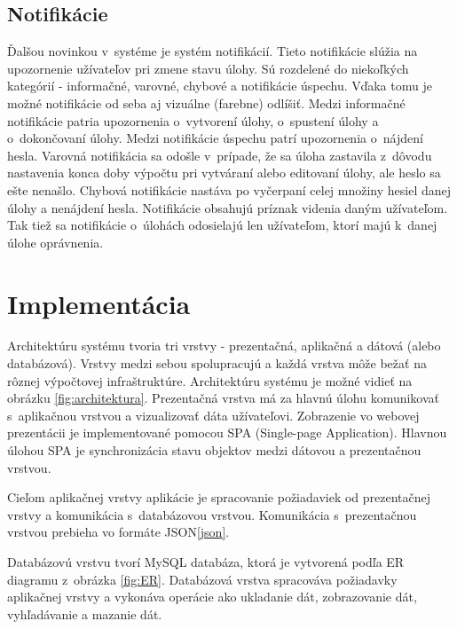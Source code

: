 \documentclass[slovak]{fitthesis}
\begin{document}
\section{Notifikácie}
Ďalšou novinkou v~systéme je systém notifikácií. Tieto notifikácie slúžia na upozornenie užívateľov pri zmene stavu úlohy. Sú rozdelené do niekoľkých kategórií - informačné, varovné, chybové a notifikácie úspechu. Vďaka tomu je možné notifikácie od seba aj vizuálne (farebne) odlíšiť. Medzi informačné notifikácie patria upozornenia o~vytvorení úlohy, o~spustení úlohy a o~dokončovaní úlohy. Medzi notifikácie úspechu patrí upozornenia o~nájdení hesla. Varovná notifikácia sa odošle v~prípade, že sa úloha zastavila z~dôvodu nastavenia konca doby výpočtu pri vytváraní alebo editovaní úlohy, ale heslo sa ešte nenašlo. Chybová notifikácie nastáva po vyčerpaní celej množiny hesiel danej úlohy a nenájdení hesla. Notifikácie obsahujú príznak videnia daným užívateľom. Tak tiež sa notifikácie o~úlohách odosielajú len užívateľom, ktorí majú k~danej úlohe oprávnenia.





\chapter{Implementácia}\label{implementacia}
Architektúru systému tvoria tri vrstvy - prezentačná, aplikačná a dátová (alebo databázová). Vrstvy medzi sebou spolupracujú a každá vrstva môže bežať na rôznej výpočtovej infraštruktúre. Architektúru systému je možné vidieť na obrázku \ref{fig:architektura}.
Prezentačná vrstva má za hlavnú úlohu komunikovať s~aplikačnou vrstvou a vizualizovať dáta užívateľovi. Zobrazenie vo webovej prezentácii je implementované pomocou SPA (Single-page Application). Hlavnou úlohou SPA je synchronizácia stavu objektov medzi dátovou a prezentačnou vrstvou. 

Cieľom aplikačnej vrstvy aplikácie je spracovanie požiadaviek od prezentačnej vrstvy a komunikácia s~databázovou vrstvou. Komunikácia s~prezentačnou vrstvou prebieha vo formáte JSON\ref{json}.

Databázovú vrstvu tvorí MySQL databáza, ktorá je vytvorená podľa ER diagramu z~obrázka \ref{fig:ER}. Databázová vrstva spracováva požiadavky aplikačnej vrstvy a vykonáva operácie ako ukladanie dát, zobrazovanie dát, vyhľadávanie a mazanie dát.
\end{document}

